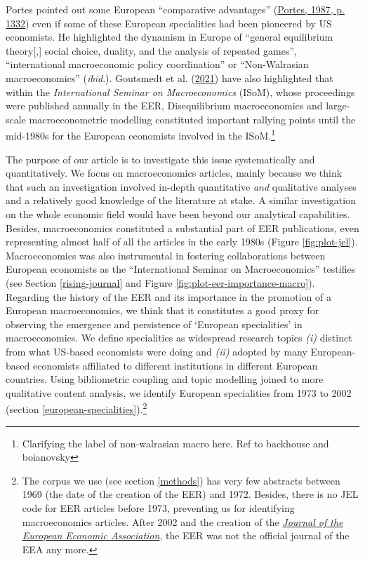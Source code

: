\documentclass[]{elsarticle} %
\begin{document}
Portes pointed out some European ``comparative advantages''
(\protect\hyperlink{ref-portes1987}{Portes, 1987, p. 1332}) even if some
of these European specialities had been pioneered by US economists. He
highlighted the dynamism in Europe of ``general equilibrium
theory{[},{]} social choice, duality, and the analysis of repeated
games'', ``international macroeconomic policy coordination'' or
``Non-Walrasian macroeconomics'' (\emph{ibid}.). Goutsmedt et al.
(\protect\hyperlink{ref-goutsmedt2021}{2021}) have also highlighted that
within the \emph{International Seminar on Macroeconomics} (ISoM), whose
proceedings were published annually in the EER, Disequilibrium
macroeconomics and large-scale macroeconometric modelling constituted
important rallying points until the mid-1980s for the European
economists involved in the ISoM.\footnote{Clarifying the label of
  non-walrasian macro here. Ref to backhouse and boianovsky}

The purpose of our article is to investigate this issue systematically
and quantitatively. We focus on macroeconomics articles, mainly because
we think that such an investigation involved in-depth quantitative
\emph{and} qualitative analyses and a relatively good knowledge of the
literature at stake. A similar investigation on the whole economic field
would have been beyond our analytical capabilities. Besides,
macroeconomics constituted a substantial part of EER publications, even
representing almost half of all the articles in the early 1980s (Figure
\ref{fig:plot-jel}). Macroeconomics was also instrumental in fostering
collaborations between European economists as the ``International
Seminar on Macroeconomics'' testifies (see Section \ref{rising-journal}
and Figure \ref{fig:plot-eer-importance-macro}). Regarding the history
of the EER and its importance in the promotion of a European
macroeconomics, we think that it constitutes a good proxy for observing
the emergence and persistence of `European specialities' in
macroeconomics. We define specialities as widespread research topics
\emph{(i)} distinct from what US-based economists were doing and
\emph{(ii)} adopted by many European-based economists affiliated to
different institutions in different European countries. Using
bibliometric coupling and topic modelling joined to more qualitative
content analysis, we identify European specialities from 1973 to 2002
(section \ref{european-specialities}).\footnote{The corpus we use (see
  section \ref{methods}) has very few abstracts between 1969 (the date
  of the creation of the EER) and 1972. Besides, there is no JEL code
  for EER articles before 1973, preventing us for identifying
  macroeconomics articles. After 2002 and the creation of the
  \href{https://academic.oup.com/jeea}{\emph{Journal of the European
  Economic Association}}, the EER was not the official journal of the
  EEA any more.}
\end{document}
